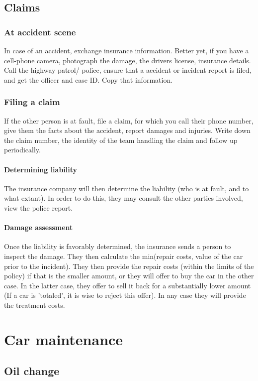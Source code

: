 \documentclass[oneside, article]{memoir}
\begin{document}
\section{Claims}
\subsection{At accident scene}
In case of an accident, exchange insurance information.  Better yet, if you have a cell-phone camera, photograph the damage, the drivers license, insurance details. Call the highway patrol/ police, ensure that a accident or incident report is filed, and get the officer and case ID. Copy that information.

\subsection{Filing a claim}
If the other person is at fault, file a claim, for which you call their phone number, give them the facts about the accident, report damages and injuries. Write down the claim number, the identity of the team handling the claim and follow up periodically.

\subsubsection{Determining liability}
The insurance company will then determine the liability (who is at fault, and to what extant). In order to do this, they may consult the other parties involved, view the police report.

\subsubsection{Damage assessment}
Once the liability is favorably determined, the insurance sends a person to inspect the damage. They then calculate the min(repair costs, value of the car prior to the incident). They then provide the repair costs (within the limits of the policy) if that is the smaller amount, or they will offer to buy the car in the other case. In the latter case, they offer to sell it back for a substantially lower amount (If a car is 'totaled', it is wise to reject this offer). In any case they will provide the treatment costs.

\chapter{Car maintenance}
\section{Oil change}
\end{document}
